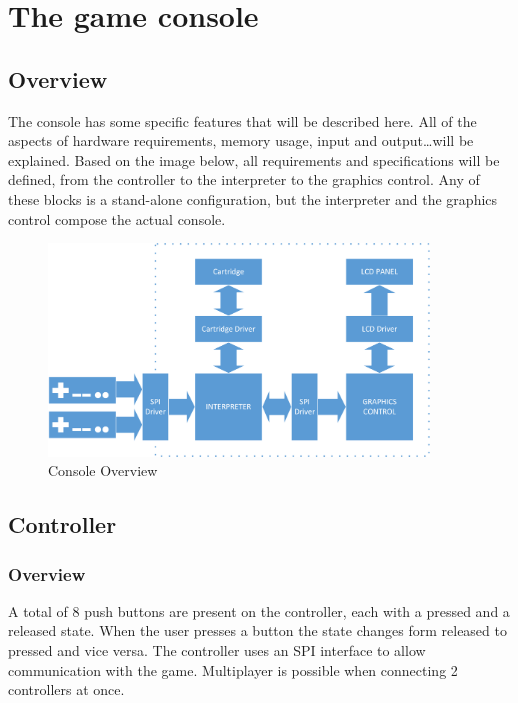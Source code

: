\chapter{The game console}
\label{cha:GameConsole}

\section{Overview}
	\par The console has some specific features that will be described here. All of the aspects of hardware requirements, memory usage, input and output\ldots will be explained.
	Based on the image below, all requirements and specifications will be defined, from the controller to the interpreter to the graphics control.
	Any of these blocks is a stand-alone configuration, but the interpreter and the graphics control compose the actual console.

	\begin{figure}[H]
		\centering
		\includegraphics[width=0.9\textwidth]{GameConsole/LumenGameConsoleOverview.PNG}
		\caption{Console Overview}\par
		\label{fig:LumenGameConsoleOverview}
	\end{figure}

\newpage
\section{Controller}
	\subsection{Overview}
		\par A total of 8 push buttons are present on the controller, each with a pressed and a released state. When the user presses a button the state changes form released to pressed and vice versa. The controller uses an SPI interface to allow communication with the game.
		Multiplayer is possible when connecting 2 controllers at once.

